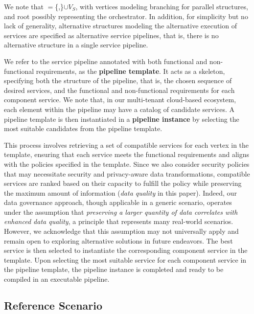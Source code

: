 \vspace{0.5em}

We note that \V$=$\{,\}$\cup$$V_S$, with vertices  modeling branching for parallel structures, and root  possibly representing the orchestrator. In addition, for simplicity but no lack of generality, alternative structures modeling the alternative execution of services are specified as alternative service pipelines, that is, there is no alternative structure in a single service pipeline.

We refer to the service pipeline annotated with both functional and non-functional requirements, as the \textbf{pipeline template}. It acts as a skeleton, specifying both the structure of the pipeline, that is, the chosen sequence of desired services, and the functional and non-functional requirements for each component service. We note that, in our multi-tenant cloud-based ecosystem, each element within the pipeline may have a catalog of candidate services. A pipeline template is then instantiated in a \textbf{pipeline instance} by selecting the most suitable candidates from the pipeline template.

This process involves retrieving a set of compatible services for each vertex in the template, ensuring that each service meets the functional requirements and aligns with the policies specified in the template. Since we also consider security policies that may necessitate security and privacy-aware data transformations, compatible services are ranked based on their capacity to fulfill the policy while preserving the maximum amount of information (\emph{data quality} in this paper). Indeed, our data governance approach, though applicable in a generic scenario, operates under the assumption that \textit{preserving a larger quantity of data correlates with enhanced data quality}, a principle that represents many real-world scenarios. However, we acknowledge that this assumption may not universally apply and remain open to exploring alternative solutions in future endeavors.
%
The best service is then selected to instantiate the corresponding component service in the template.
Upon selecting the most suitable service for each component service in the pipeline template, the pipeline instance is completed and ready to be compiled in an executable pipeline.

\subsection{Reference Scenario}\label{sec:service_definition}

